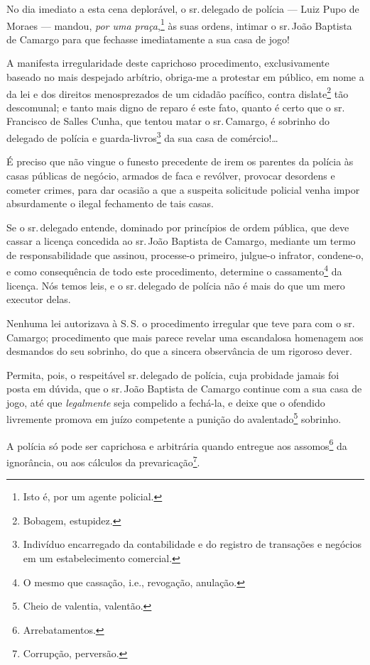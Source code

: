 No dia imediato a esta cena deplorável, o sr.\,delegado de polícia ---
Luiz Pupo de Moraes --- mandou, \emph{por uma praça},\footnote{ Isto é,
  por um agente policial.} às suas ordens, intimar o sr.\,João Baptista
de Camargo para que fechasse imediatamente a sua casa de jogo!

A manifesta irregularidade deste caprichoso procedimento, exclusivamente
baseado no mais despejado arbítrio, obriga-me a protestar em público, em
nome a da lei e dos direitos menosprezados de um cidadão pacífico,
contra dislate\footnote{ Bobagem, estupidez.} tão descomunal; e tanto
mais digno de reparo é este fato, quanto é certo que o sr.\,Francisco de
Salles Cunha, que tentou matar o sr.\,Camargo, é sobrinho do delegado de
polícia e guarda-livros\footnote{ Indivíduo encarregado da
  contabilidade e do registro de transações e negócios em um
  estabelecimento comercial.} da sua casa de comércio!\ldots{}

É preciso que não vingue o funesto precedente de irem os parentes da
polícia às casas públicas de negócio, armados de faca e revólver,
provocar desordens e cometer crimes, para dar ocasião a que a suspeita
solicitude policial venha impor absurdamente o ilegal fechamento de tais
casas.

Se o sr.\,delegado entende, dominado por princípios de ordem pública, que
deve cassar a licença concedida ao sr.\,João Baptista de Camargo,
mediante um termo de responsabilidade que assinou, processe-o primeiro,
julgue-o infrator, condene-o, e como consequência de todo este
procedimento, determine o cassamento\footnote{ O mesmo que cassação,
  i.e., revogação, anulação.} da licença. Nós temos leis, e o sr.\,delegado de polícia não é mais do que um mero executor delas.

Nenhuma lei autorizava à S.\,S. o procedimento irregular que teve para
com o sr.\,Camargo; procedimento que mais parece revelar uma escandalosa
homenagem aos desmandos do seu sobrinho, do que a sincera observância de
um rigoroso dever.

Permita, pois, o respeitável sr.\,delegado de polícia, cuja probidade
jamais foi posta em dúvida, que o sr.\,João Baptista de Camargo continue
com a sua casa de jogo, até que \emph{legalmente} seja compelido a
fechá-la, e deixe que o ofendido livremente promova em juízo competente
a punição do avalentado\footnote{ Cheio de valentia, valentão.}
sobrinho.

A polícia só pode ser caprichosa e arbitrária quando entregue aos
assomos\footnote{ Arrebatamentos.} da ignorância, ou aos cálculos da
prevaricação\footnote{ Corrupção, perversão.}.

